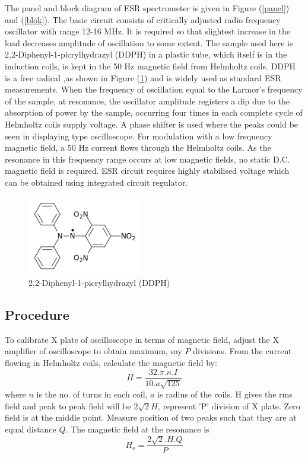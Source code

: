 \documentclass[a4paper, amsfonts, amssymb, amsmath, reprint, showkeys, nofootinbib, twoside]{revtex4-1}
\begin{document}
The panel and block diagram of ESR spectrometer is given in Figure (\ref{panel}) and (\ref{blok}). The basic circuit consists of critically adjusted radio frequency oscillator with range 12-16 MHz. It is required so that slightest increase in the load decreases amplitude of oscillation to some extent. The sample used here is 2,2-Diphenyl-1-picrylhydrazyl (DDPH) in a plastic tube, which itself is in the induction coils, is kept in the 50 Hz magnetic field from Helmholtz coils. DDPH is a free radical ,as shown in Figure (\ref{dd}) and is widely used as standard ESR measurements. When the frequency of oscillation equal to the Larmor's frequency of the sample, at resonance, the oscillator amplitude registers a dip due to the absorption of power by the sample, occurring four times in each complete cycle of Helmholtz coils supply voltage. A phase shifter is used where the peaks could be seen in displaying type oscilloscope. For modulation with a low frequency magnetic field, a 50 Hz current flows through the Helmholtz coils. As the resonance in this frequency range occurs at low magnetic fields, no static D.C. magnetic field is required. ESR circuit requires highly stabilised voltage which can be obtained using integrated circuit regulator. 

\begin{figure}[htbp] %
   \centering
   \includegraphics[width=5cm]{4} 
   \caption{2,2-Diphenyl-1-picrylhydrazyl (DDPH)}
   \label{dd}
\end{figure}

\subsection{Procedure}
To calibrate X plate of oscilloscope in terms of magnetic field, adjust the X amplifier of oscilloscope to obtain maximum, say $P$ divisions. From the current flowing in Helmholtz coils, calculate the magnetic field by:
\begin{equation}\label{q1}
H=\frac{32.\pi.n.I}{10.a\sqrt{125}}
\end{equation}
where $n$ is the no. of turns in each coil, $a$ is radius of the coils. 
H gives the rms field and peak to peak field will be $2\sqrt{2}H$, represent 'P' division of X plate. Zero field is at the middle point. Measure position of two peaks such that they are at equal distance $Q$. The magnetic field at the resonance is
\begin{equation}\label{q2}
H_o=\frac{2\sqrt{2}.H.Q}{P}
\end{equation}
\end{document}
